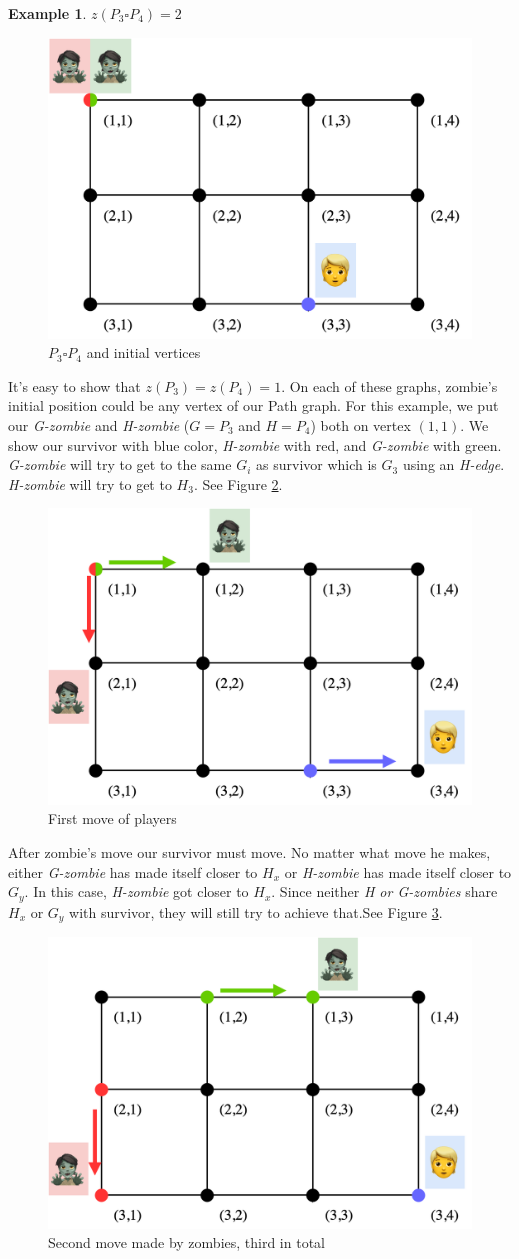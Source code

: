 \documentclass[1p]{elsarticle}
\newtheorem{example}[theorem]{Example}
\begin{document}
\begin{example} $z(P_3 \square P_4 ) = 2$
	
\end{example}
\begin{figure}[h!]
	\centering
	\includegraphics[width=0.5\linewidth]{fig/p34m1.png}
	\caption{$P_3 \square P_4$ and initial vertices}
	\label{fig:p3}
\end{figure}
It's easy to show that $z(P_3) = z(P_4) = 1$. On each of these graphs, zombie's initial position could be any vertex of
our Path graph. For this example, we put our {\it G-zombie} and {\it H-zombie} ($G = P_3$ and $H = P_4$) both on vertex
$(1,1)$. We show our survivor with blue color, {\it H-zombie} with red, and {\it G-zombie} with green. {\it G-zombie}
will try to get to the same $G_{i}$ as survivor which is $G_3$ using an {\it H-edge}. {\it
H-zombie} will try to get to $H_3$. See Figure \ref{fig:p4}.
\begin{figure}[h!]
	\centering
	\includegraphics[width=0.5\linewidth]{fig/p34m2.png}
	\caption{First move of players}
	\label{fig:p4}
\end{figure}
After zombie's move our survivor must move. No matter what move he makes, either {\it G-zombie} has made itself closer
to $H_x$ or {\it H-zombie} has made itself closer to $G_y$. In this case, {\it H-zombie} got closer to  $H_x$. Since
neither {\it H or G-zombies}  share $H_x$ or $G_y$ with survivor, they will still try to achieve that.See Figure
\ref{fig:p5}.
\begin{figure}[h!]
	\centering
	\includegraphics[width=0.5\linewidth]{fig/p34m3.png}
	\caption{Second move made by zombies, third in total}
	\label{fig:p5}
\end{figure}
\end{document}
